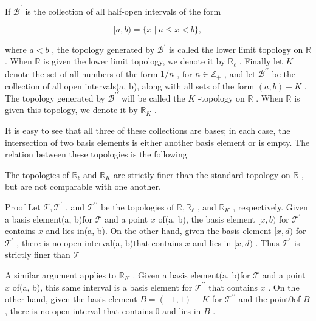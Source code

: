 If \({\mathcal{B}}^{\prime }\) is the collection of all half-open intervals of the form

\[
\lbrack a,b) = \{ x \mid  a \leq  x < b\} ,
\]

where \(a < b\) , the topology generated by \({\mathcal{B}}^{\prime }\) is called the lower limit topology on \(\mathbb{R}\) . When \(\mathbb{R}\) is given the lower limit topology, we denote it by \({\mathbb{R}}_{\ell }\) . Finally let \(K\) denote the set of all numbers of the form \(1/n\) , for \(n \in  {\mathbb{Z}}_{ + }\) , and let \({\mathcal{B}}^{\prime \prime }\) be the collection of all open intervals(a, b), along with all sets of the form \(\left( {a,b}\right)  - K\) . The topology generated by \({\mathcal{B}}^{\prime \prime }\) will be called the \(K\) -topology on \(\mathbb{R}\) . When \(\mathbb{R}\) is given this topology, we denote it by \({\mathbb{R}}_{K}\) .

It is easy to see that all three of these collections are bases; in each case, the intersection of two basis elements is either another basis element or is empty. The relation between these topologies is the following

\begin{lemma} The topologies of \({\mathbb{R}}_{\ell }\) and \({\mathbb{R}}_{K}\) are strictly finer than the standard topology on \(\mathbb{R}\) , but are not comparable with one another.
\end{lemma}

Proof Let \(\mathcal{T},{\mathcal{T}}^{\prime }\) , and \({\mathcal{T}}^{\prime \prime }\) be the topologies of \(\mathbb{R},{\mathbb{R}}_{\ell }\) , and \({\mathbb{R}}_{K}\) , respectively. Given a basis element(a, b)for \(\mathcal{T}\) and a point \(x\) of(a, b), the basis element \(\lbrack x,b)\) for \({\mathcal{T}}^{\prime }\) contains \(x\) and lies in(a, b). On the other hand, given the basis element \(\lbrack x,d)\) for \({\mathcal{T}}^{\prime }\) , there is no open interval(a, b)that contains \(x\) and lies in \(\lbrack x,d)\) . Thus \({\mathcal{T}}^{\prime }\) is strictly finer than \(\mathcal{T}\)

A similar argument applies to \({\mathbb{R}}_{K}\) . Given a basis element(a, b)for \(\mathcal{T}\) and a point \(x\) of(a, b), this same interval is a basis element for \({\mathcal{T}}^{\prime \prime }\) that contains \(x\) . On the other hand, given the basis element \(B = \left( {-1,1}\right)  - K\) for \({\mathcal{T}}^{\prime \prime }\) and the point0of \(B\) , there is no open interval that contains 0 and lies in \(B\) .

